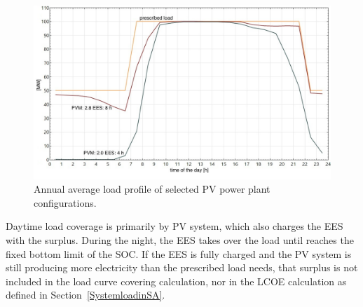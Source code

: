 \begin{figure}[htbp]  
\centering
\includegraphics[width=0.9\linewidth]{FIG/PV_annual_profil}
\caption[Annual average load profile of selected PV power plant configurations.]{Annual average load profile of selected PV power plant configurations.}\label{PV_annual_profil}
\end{figure}


Daytime load coverage is primarily by PV system, which also charges the EES with the surplus. During the night, the EES takes over the load until reaches the fixed bottom limit of the SOC. If the EES is fully charged and the PV system is still producing more electricity than the prescribed load needs, that surplus is not included in the load curve covering calculation, nor in the LCOE calculation as defined in Section~\ref{SystemloadinSA}. 



